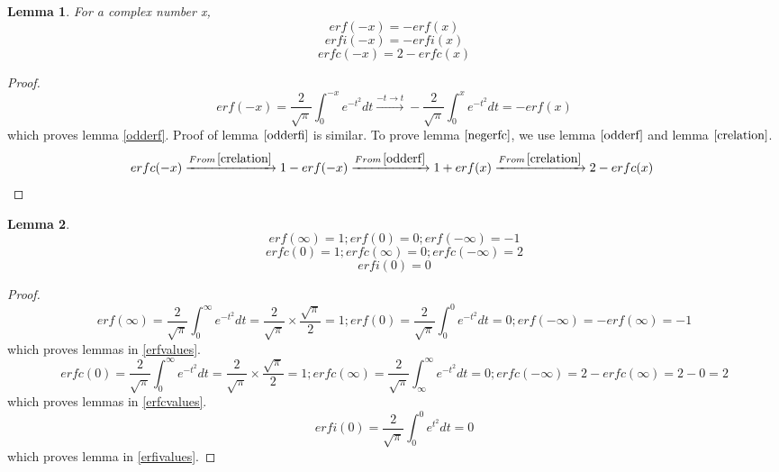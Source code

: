 \documentclass[a4paper,twoside,10pt]{article}
\newtheorem{lemma}{Lemma}[theorem]
\begin{document}
\begin{lemma}
For a complex number x,
\begin{equation}\label{odderf}
 erf(-x)=-erf(x) 
\end{equation}
\begin{equation}\label{odderfi}
 erfi(-x)=-erfi(x) 
\end{equation}
\begin{equation}\label{negerfc}
 erfc(-x)=2-erfc(x) 
\end{equation}
\end{lemma}
\begin{proof}
\[ erf(-x) = \frac{2}{\sqrt{\pi}} \int_0^{-x} e^{-t^2} dt \xrightarrow{-t\rightarrow t} - \frac{2}{\sqrt{\pi}} \int_0^x e^{-t^2} dt  = -erf(x)  \] which proves lemma \eqref{odderf}. Proof of lemma $\eqref{odderfi}$ is similar. 
To prove lemma $\eqref{negerfc}$, we use lemma $\eqref{odderf}$ and lemma $\eqref{crelation}$. 
\[ erfc(-x) \xrightarrow{From\, \eqref{crelation}} 1- erf(-x) \xrightarrow{From\, \eqref{odderf}} 1+erf(x) \xrightarrow{From\, \eqref{crelation}} 2-erfc(x)  \,\,  \]
\end{proof}

\begin{lemma}

\begin{equation}\label{erfvalues}
 erf(\infty)=1; erf(0)=0; erf(-\infty)=-1 
\end{equation}
\begin{equation}\label{erfcvalues}
 erfc(0)=1 ; erfc(\infty)=0 ; erfc(-\infty)=2 
\end{equation}
\begin{equation}\label{erfivalues}
 erfi(0)=0 
\end{equation}
\end{lemma}
\begin{proof}
\[ erf(\infty) = \frac{2}{\sqrt{\pi}} \int_0^{\infty} e^{-t^2} dt =\frac{2}{\sqrt{\pi}} \times \frac{\sqrt{\pi}}{2} = 1 ; erf(0) =  \frac{2}{\sqrt{\pi}} \int_0^0 e^{-t^2} dt = 0 ; erf(-\infty)= -erf(\infty)=-1   \] which proves lemmas in \eqref{erfvalues}. 
\[ erfc(0) = \frac{2}{\sqrt{\pi}} \int_0^{\infty} e^{-t^2} dt =\frac{2}{\sqrt{\pi}} \times \frac{\sqrt{\pi}}{2} = 1 ; erfc(\infty) =  \frac{2}{\sqrt{\pi}} \int_{\infty}^{\infty} e^{-t^2} dt = 0 ; erfc(-\infty)= 2-erfc(\infty)=2-0=2   \] which proves lemmas in \eqref{erfcvalues}. 
\[ erfi(0) = \frac{2}{\sqrt{\pi}} \int_0^0 e^{t^2} dt =0   \] which proves lemma in \eqref{erfivalues}.  \end{proof}
\end{document}
